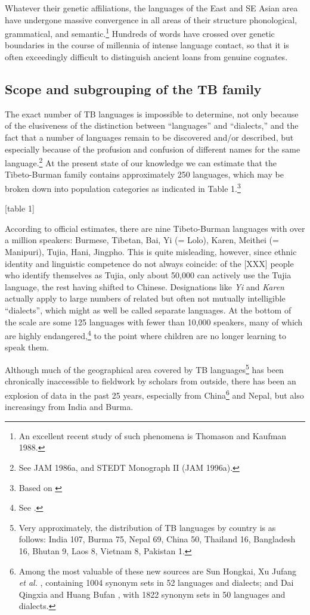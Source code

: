 Whatever their genetic affiliations, the languages of the East and SE Asian area have undergone massive convergence in all areas of their structure  phonological, grammatical, and semantic.\footnote{An excellent recent study of such phenomena is Thomason and Kaufman 1988.}  Hundreds of words have crossed over genetic boundaries in the course of millennia of intense language contact, so that it is often exceedingly difficult to distinguish ancient loans from genuine cognates.

\subsection{Scope and subgrouping of the TB family}

The exact number of TB languages is impossible to determine, not only because of the elusiveness of the distinction between “languages” and “dialects,” and the fact that a number of languages remain to be discovered and/or described, but especially because of the profusion and confusion of different names for the same language.\footnote{See JAM 1986a, and STEDT Monograph II (JAM 1996a).} At the present state of our knowledge we can estimate that the Tibeto-Burman family contains approximately 250 languages, which may be broken down into population categories as indicated in Table 1.\footnote{Based on \citealt{G-ELW}}

[table 1]

According to official estimates, there are nine Tibeto-Burman languages with over a million speakers: Burmese, Tibetan, Bai, Yi (= Lolo), Karen, Meithei (= Manipuri), Tujia, Hani, Jingpho. This is quite misleading, however, since ethnic identity and linguistic competence do not always coincide: of the [XXX] people who identify themselves as Tujia, only about 50,000 can actively use the Tujia language, the rest having shifted to Chinese. Designations like {\it Yi} and {\it Karen} actually apply to large numbers of related but often not mutually intelligible “dialects”, which might as well be called separate languages. At the bottom of the scale are some 125 languages with fewer than 10,000 speakers, many of which are highly endangered,\footnote{See \citealt{Matisoff1991b}.} to the point where children are no longer learning to speak them.

Although much of the geographical area covered by TB languages\footnote{Very approximately, the distribution of TB languages by country is as follows: India 107, Burma 75, Nepal 69, China 50, Thailand 16, Bangladesh 16, Bhutan 9, Laos 8, Vietnam 8, Pakistan 1.} has been chronically inaccessible to fieldwork by scholars from outside, there has been an explosion of data in the past 25 years, especially from China\footnote{Among the most valuable of these new sources are Sun Hongkai, Xu Jufang {\it et al.} \citep{ZMYYC}, containing 1004 synonym sets in 52 languages and dialects; and Dai Qingxia and Huang Bufan \citep{TBL}, with 1822 synonym sets in 50 languages and dialects.} and Nepal, but also increasingy from India and Burma.

